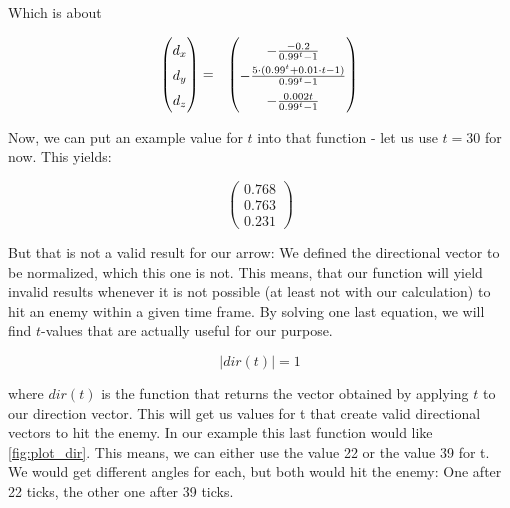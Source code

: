 Which is about

\begin{eqnarray*}
    \begin{pmatrix}d_x \\ d_y \\ d_z \end{pmatrix}
    & = &
    \renewcommand*{\arraystretch}{1.5}
    \begin{pmatrix}
        -\frac{-0.2}{0.99^t - 1} \\
        -\frac{5 \cdot (0.99^t + 0.01 \cdot t - 1)}{0.99^t - 1} \\
        -\frac{0.002t}{0.99^t - 1} 
    \end{pmatrix}
\end{eqnarray*}

Now, we can put an example value for $t$ into that function - let us use $t = 30$ for now. This yields:

\begin{equation*}
    \begin{pmatrix}
        0.768 \\
        0.763 \\
        0.231 
    \end{pmatrix}
\end{equation*}

 But that is not a valid result for our arrow: We defined the directional vector to be normalized, which this one is not. This means, that our function will yield invalid results whenever it is not possible (at least not with our calculation) to hit an enemy within a given time frame. By solving one last equation, we will find $t$-values that are actually useful for our purpose.
 
 \begin{equation*}
     |dir(t)|=1
 \end{equation*}

where $dir(t)$ is the function that returns the vector obtained by applying $t$ to our direction vector. This will get us values for t that create valid directional vectors to hit the enemy. In our example this last function would like \figurename{} \ref{fig:plot_dir}. This means, we can either use the value 22 or the value 39 for t. We would get different angles for each, but both would hit the enemy: One after 22 ticks, the other one after 39 ticks.


